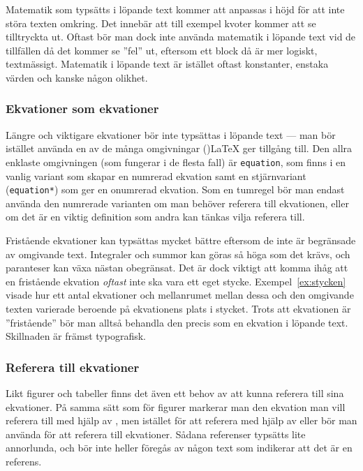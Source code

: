 \documentclass[../../a4.tex]{subfiles}
\begin{document}
Matematik som typsätts i löpande text kommer att anpassas i höjd för att
inte störa texten omkring. Det innebär att till exempel kvoter kommer att
se tilltryckta ut. Oftast bör man dock inte använda matematik i löpande
text vid de tillfällen då det kommer se ”fel” ut, eftersom ett block då
är mer logiskt, textmässigt. Matematik i löpande text är istället oftast
konstanter, enstaka värden och kanske någon olikhet.

\subsubsection{Ekvationer som ekvationer}\label{sec:3:ekvsomekv}
Längre och viktigare ekvationer bör inte typsättas i löpande text —
man bör istället använda en av de många omgivningar (\AmS)\LaTeX{} ger
tillgång till. Den allra enklaste omgivningen (som fungerar i de flesta
fall) är \texttt{equation}, som finns i en vanlig variant som skapar 
en numrerad ekvation samt en stjärnvariant (\texttt{equation*}) som ger en
onumrerad ekvation. Som en tumregel bör man endast använda den numrerade
varianten om man behöver referera till ekvationen, eller om det är en
viktig definition som andra kan tänkas vilja referera till.

Fristående ekvationer kan typsättas mycket bättre eftersom de inte är 
begränsade av omgivande text. Integraler och summor kan göras så höga som
det krävs, och paranteser kan växa nästan obegränsat. Det är dock viktigt
att komma ihåg att en fristående ekvation \emph{oftast} inte ska vara ett 
eget
stycke. Exempel~\vref{ex:stycken} visade hur ett antal ekvationer och
mellanrumet mellan dessa och den omgivande texten varierade beroende på
	ekvationens plats i stycket. Trots att ekvationen är ”fristående” bör
	man alltså behandla den precis som en
ekvation i löpande text. Skillnaden är främst typografisk.

\subsubsection{Referera till ekvationer}
Likt figurer och tabeller finns det även ett behov av att kunna referera
till sina ekvationer. På samma sätt som för figurer markerar man den
ekvation man vill referera till med hjälp av , men istället
för att referera med hjälp av  eller  bör man använda
 för att referera till ekvationer. Sådana referenser typsätts
lite annorlunda, och bör inte heller föregås av någon text som indikerar
att det är en referens.
\end{document}
